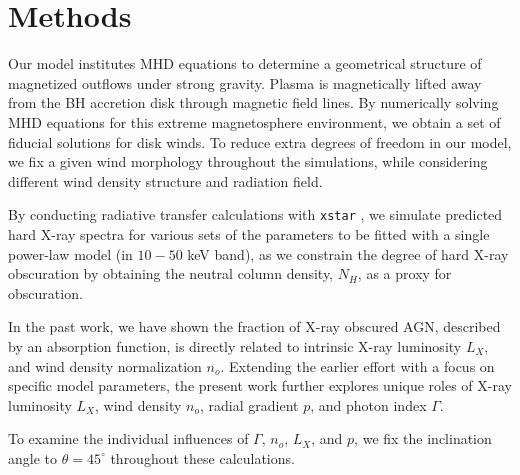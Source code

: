 \documentclass[12pt,preprint]{aastex631}
\def\deg{^\circ}
\begin{document}

\section{Methods}

Our model institutes MHD equations to determine a geometrical structure of magnetized outflows under strong gravity.  Plasma is magnetically lifted away from the BH accretion disk through magnetic field lines.  By numerically solving MHD equations for this extreme magnetosphere environment, we obtain a set of fiducial solutions for disk winds.  To reduce extra degrees of freedom in our model, we fix a given wind morphology throughout the simulations, while considering different wind density structure and radiation field.

By conducting radiative transfer calculations with {\tt xstar} \citep[][]{Kallman01}, we simulate predicted hard X-ray spectra for various sets of the parameters to be fitted with a single power-law model (in $10-50$ keV band), as we constrain the degree of hard X-ray obscuration by obtaining the neutral column density, $N_H$, as a proxy for obscuration.

In the past work, we have shown the fraction of X-ray obscured AGN, described by an absorption function, is directly related to intrinsic X-ray luminosity $L_X$, and wind density normalization $n_o$.  
%
Extending the earlier effort with a focus on specific model parameters, the present work further explores unique roles of X-ray luminosity $L_X$, wind density $n_o$, radial gradient $p$, and photon index $\Gamma$.  



To examine the individual influences of $\Gamma$, $n_o$, $L_X$, and $p$, we fix the inclination angle to  $\theta = 45\deg$ throughout these calculations. 

\end{document}
